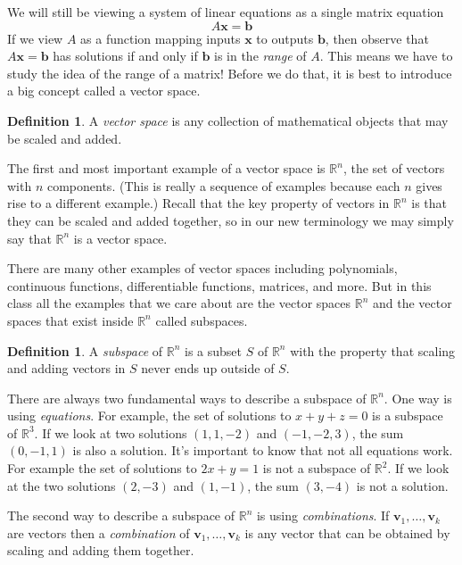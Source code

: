 \documentclass[11pt,oneside]{amsbook}
\newcommand{\R}{\mathbb R}
\theoremstyle{definition}
\theoremstyle{plain}
\theoremstyle{definition}
\newtheorem{definition}[theorem]{Definition}
\theoremstyle{remark}
\numberwithin{equation}{section}
\numberwithin{figure}{section}
\begin{document}
We will still be viewing a system of linear equations as a single matrix equation
\[A\mathbf{x}=\mathbf{b}
\]
If we view $A$ as a function mapping inputs $\mathbf{x}$ to outputs $\mathbf{b}$, then observe that $A\mathbf{x}=\mathbf{b}$ has solutions if and only if $\mathbf{b}$ is in the \emph{range} of $A$. This means we have to study the idea of the range of a matrix! Before we do that, it is best to introduce a big concept called a vector space.

\begin{definition}
  A \emph{vector space} is any collection of mathematical objects that may be scaled and added.
\end{definition}

The first and most important example of a vector space is $\R^n$, the set of vectors with $n$ components. (This is really a sequence of examples because each $n$ gives rise to a different example.) Recall that the key property of vectors in $\R^n$ is that they can be scaled and added together, so in our new terminology we may simply say that $\R^n$ is a vector space.

There are many other examples of vector spaces including polynomials, continuous functions, differentiable functions, matrices, and more. But in this class all the examples that we care about are the vector spaces $\R^n$ and the vector spaces that exist inside $\R^n$ called subspaces.

\begin{definition}
  A \emph{subspace} of $\R^n$ is a subset $S$ of $\R^n$ with the property that scaling and adding vectors in $S$ never ends up outside of $S$.
\end{definition}

There are always two fundamental ways to describe a subspace of $\R^n$. One way is using \emph{equations}. For example, the set of solutions to $x+y+z=0$ is a subspace of $\R^3$. If we look at two solutions $(1,1,-2)$ and $(-1,-2,3)$, the sum $(0,-1,1)$ is also a solution. It's important to know that not all equations work. For example the set of solutions to $2x+y=1$ is not a subspace of $\R^2$. If we look at the two solutions $(2,-3)$ and $(1,-1)$, the sum $(3,-4)$ is not a solution.

The second way to describe a subspace of $\R^n$ is using \emph{combinations}. If $\textbf{v}_1,\ldots,\textbf{v}_k$ are vectors then a \emph{combination} of $\textbf{v}_1,\ldots,\textbf{v}_k$ is any vector that can be obtained by scaling and adding them together.
\end{document}
